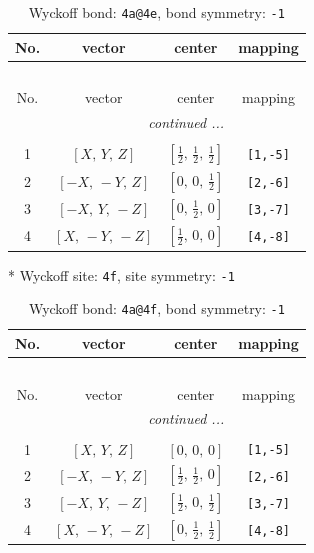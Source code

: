 \documentclass[fleqn,8pt]{jsarticle}
\begin{document}
\begin{longtable}{cccc}
\caption{Wyckoff bond: {\tt 4a@4e}, bond symmetry: {\tt -1}}
 \\
 \hline \hline
No. & vector & center & mapping \\ \hline \endfirsthead

\multicolumn{3}{l}{\tablename\ \thetable{}} \\
 \hline \hline
No. & vector & center & mapping \\ \hline \endhead

 \hline \hline
\multicolumn{3}{r}{\footnotesize\it continued ...} \\ \endfoot

 \hline \hline
\multicolumn{3}{r}{} \\ \endlastfoot

1 & $\left[ X,\, Y,\, Z \right]$ & $\left[ \frac{1}{2},\, \frac{1}{2},\, \frac{1}{2} \right]$ & {\tt [1,-5]} \\ \hline
2 & $\left[ - X,\, - Y,\, Z \right]$ & $\left[ 0,\, 0,\, \frac{1}{2} \right]$ & {\tt [2,-6]} \\ \hline
3 & $\left[ - X,\, Y,\, - Z \right]$ & $\left[ 0,\, \frac{1}{2},\, 0 \right]$ & {\tt [3,-7]} \\ \hline
4 & $\left[ X,\, - Y,\, - Z \right]$ & $\left[ \frac{1}{2},\, 0,\, 0 \right]$ & {\tt [4,-8]} \\
\end{longtable}
* Wyckoff site: {\tt 4f}, site symmetry: {\tt -1}
\renewcommand{\arraystretch}{1.2}
\begin{longtable}{cccc}
\caption{Wyckoff bond: {\tt 4a@4f}, bond symmetry: {\tt -1}}
 \\
 \hline \hline
No. & vector & center & mapping \\ \hline \endfirsthead

\multicolumn{3}{l}{\tablename\ \thetable{}} \\
 \hline \hline
No. & vector & center & mapping \\ \hline \endhead

 \hline \hline
\multicolumn{3}{r}{\footnotesize\it continued ...} \\ \endfoot

 \hline \hline
\multicolumn{3}{r}{} \\ \endlastfoot

1 & $\left[ X,\, Y,\, Z \right]$ & $\left[ 0,\, 0,\, 0 \right]$ & {\tt [1,-5]} \\ \hline
2 & $\left[ - X,\, - Y,\, Z \right]$ & $\left[ \frac{1}{2},\, \frac{1}{2},\, 0 \right]$ & {\tt [2,-6]} \\ \hline
3 & $\left[ - X,\, Y,\, - Z \right]$ & $\left[ \frac{1}{2},\, 0,\, \frac{1}{2} \right]$ & {\tt [3,-7]} \\ \hline
4 & $\left[ X,\, - Y,\, - Z \right]$ & $\left[ 0,\, \frac{1}{2},\, \frac{1}{2} \right]$ & {\tt [4,-8]} \\
\end{longtable}
\end{document}

